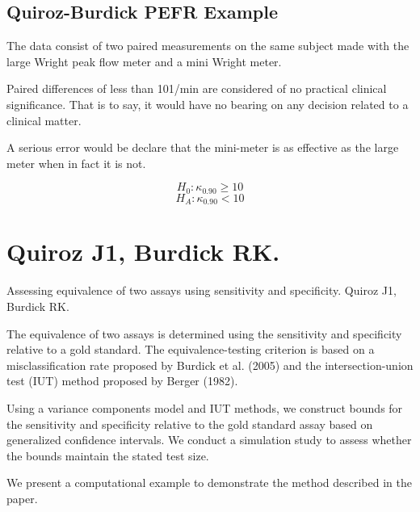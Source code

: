 \documentclass[12pt, a4paper]{article}
\begin{document}



\section{Quiroz-Burdick PEFR Example}

The data consist of two paired measurements on the same subject made with the large Wright peak flow meter and a mini
Wright meter.

Paired differences of less than 101/min are considered of no practical clinical significance. That is to say, it would have no bearing on
any decision related to a clinical matter.

A serious error would be declare that the mini-meter is as effective as the large meter when in fact it is not.


\[ H_0 : \kappa_{0.90} \geq 10 \]
\[ H_A : \kappa_{0.90} < 10 \]









\chapter{Quiroz J1, Burdick RK.}
Assessing equivalence of two assays using sensitivity and specificity.
Quiroz J1, Burdick RK.


The equivalence of two assays is determined using the sensitivity and specificity relative to a gold standard.
The equivalence-testing criterion is based on a misclassification rate proposed by Burdick et al. (2005) and
the intersection-union test (IUT) method proposed by Berger (1982). 

Using a variance components model and IUT methods, we construct bounds for the sensitivity and specificity 
relative to the gold standard assay based on generalized confidence intervals. We conduct a simulation study 
to assess whether the bounds maintain the stated test size. 

We present a computational example to demonstrate the method described in the paper.


\end{document}
